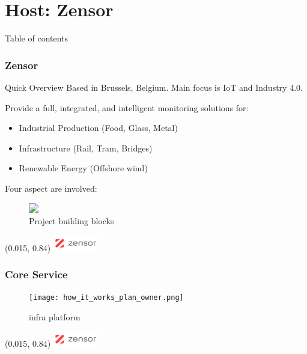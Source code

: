 \section{Host: Zensor}
\SectionPage
\begin{frame}{Table of contents}
    \tableofcontents[currentsection]
\end{frame}

\begin{frame}
    \frametitle{Zensor}

    \begin{alertblock}{Quick Overview}
        Based in Brussels, \alert{Belgium}. Main focus is \acs{IoT} and Industry 4.0.
    \end{alertblock}

    Provide a full, integrated, and intelligent monitoring solutions for:
    \begin{itemize}
        \item Industrial Production (Food, Glass, Metal)
        \item Infrastructure (Rail, Tram, Bridges)
        \item Renewable Energy (Offshore wind)
    \end{itemize}

    \pause
    \medskip
    Four aspect are involved:
    \begin{figure}[ht]
        \centering
        \includegraphics<2>[width=\textwidth]{4_phases_building_blocks.png}
        \caption{Project building blocks}
    \end{figure}

    \begin{textblock}{1}(0.015, 0.84)
        \includegraphics[width = 2cm]{frames/logos/zensor_logo.png}
    \end{textblock}
\end{frame}

\begin{frame}
    \frametitle{Core Service}
    \begin{figure}[ht]
        \centering
        \texttt{[image: how\_it\_works\_plan\_owner.png]}
        \caption{\acl{infra} platform}
    \end{figure}

    \begin{textblock}{1}(0.015, 0.84)
        \includegraphics[width = 2cm]{frames/logos/zensor_logo.png}
    \end{textblock}
\end{frame}